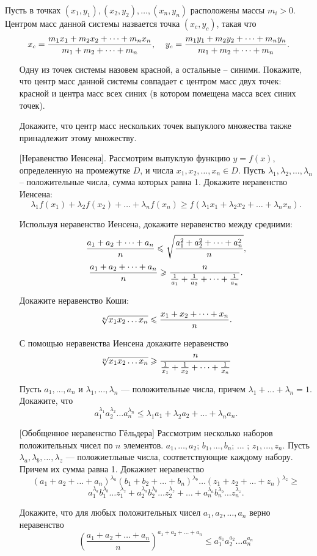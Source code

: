 \documentclass[a4paper,12pt,leqno]{article}
\begin{document}
	\begin{definition}
		Пусть в точках $(x_1, y_1), (x_2, y_2), \dots , (x_n, y_n)$ расположены массы $m_i > 0$. Центром масс данной системы назвается точка $(x_c, y_c)$, такая что
		$$x_c = {m_1x_1 + m_2x_2 + \dots + m_nx_n \over m_1 + m_2 + \dots + m_n},\;\;\;\; y_c = {m_1y_1 + m_2y_2 + \dots + m_ny_n \over m_1 + m_2 + \dots + m_n}.$$
	\end{definition}

	\begin{enumerate}
		\item[\z]  Одну из точек системы назовем красной, а остальные -- синими. Покажите, что центр масс данной системы совпадает с центром масс двух точек: красной и центра масс всех синих (в котором помещена масса всех синих точек).
		\item[\z] Докажите, что центр масс нескольких точек выпуклого множества также принадлежит этому множеству.
		\item[\z] [Неравенство Иенсена]. Рассмотрим выпуклую функцию $y = f(x)$, определенную на промежутке $D$, и числа $x_1, x_2, \dots , x_n \in D$. Пусть $\lambda_1, \lambda_2, \dots , \lambda_n$ -- положительные числа, сумма которых равна 1. Докажите неравенство Иенсена:
			$$\lambda_1f(x_1) + \lambda_2f(x_2) + \dots + \lambda_nf(x_n) \geqslant f(\lambda_1x_1 + \lambda_2x_2 + \dots + \lambda_nx_n).$$ 
		\item[\z] Используя неравенство Иенсена, докажите неравенство между средними:
		$${a_1+a_2+ \dots + a_n \over n} \leqslant \sqrt{ {a_1^2 + a_2^2 + \dots + a_n^2 \over n}  },$$
		$${a_1+a_2 + \dots + a_n \over n} \geqslant {n \over {1\over a_1} + {1 \over a_2} + \dots + {1\over a_n}}.$$ 	
		\item[\z] Докажите неравенство Коши:
					$$\sqrt[n]{x_1x_2 \dots x_n} \leqslant {x_1+x_2+\dots +x_n \over n}.$$
		\item[\z] С помощью неравенства Иенсена докажите неравенство
		$$\sqrt[n]{x_1x_2\dots x_n} \geqslant {n \over \frac{1}{x_1} + \frac{1}{x_2} + \dots + \frac{1}{x_n}}$$  
		\item[\z] Пусть $a_1, \dots, a_n$ и $\lambda_1, \dots, \lambda_n$ --- положительные числа, причем $\lambda_1 + \dots + \lambda_n = 1$. Докажите, что
		$$a_1^{\lambda_1} a_2^{\lambda_2}\dots a_n^{\lambda_n} \leqslant \lambda_1a_1 + \lambda_2a_2 + \dots + \lambda_na_n.$$
		\item[\z] [Обобщенное неравенство Гёльдера] Рассмотрим несколько наборов положительных чисел по $n$ элементов. $a_1, \dots, a_2$; $b_1, \dots, b_n$; $\dots$ ; $z_1, \dots, z_n$. 
		Пусть $\lambda_a, \lambda_b, \dots, \lambda_z$ --- положиетльные числа, соответствующие каждому набору. Причем их сумма равна 1. Докажиет неравенство
		$$(a_1+a_2 + \dots + a_n)^{\lambda_a} (b_1+b_2 + \dots + b_n)^{\lambda_b} \dots (z_1+z_2 + \dots + z_n)^{\lambda_z} \geqslant $$ $$a_1^{\lambda_a}b_1^{\lambda_b}\dots z_1^{\lambda_z} + a_2^{\lambda_a}b_2^{\lambda_b}\dots z_2^{\lambda_z} + \dots + a_n^{\lambda_a}b_n^{\lambda_b}\dots z_n^{\lambda_z}.$$
		\item[\z] Докажите, что для любых положительных чисел $a_1, a_2, \dots, a_n$ верно неравенство 
		$$\left(\frac{a_1+a_2+\dots+a_n}{n}\right)^{a_1+a_2+\dots+a_n} \leqslant a_1^{a_1} a_2^{a_2}\dots a_n^{a_n}$$ 
		


\end{enumerate}
\end{document}
